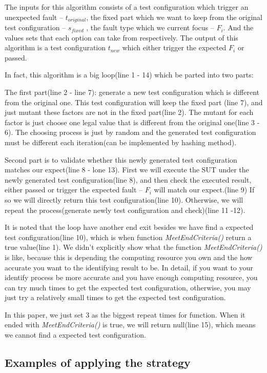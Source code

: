 \documentclass{sig-alternate}
\begin{document}
The inputs for this algorithm consists of a test configuration which trigger an unexpected fault -- $t_{original}$, the fixed part which we want to keep from the original test configuration -- $s_{fixed}$ , the fault type which we current focus -- $F_{i}$. And the values sets that each option can take from respectively.  The output of this algorithm is a test configuration $t_{new}$ which either trigger the expected $F_{i}$ or passed.

In fact, this algorithm is a big loop(line 1 - 14) which be parted into two parts:

The first part(line 2 - line 7): generate a new test configuration which is different from the original one. This test configuration will keep the fixed part (line 7), and just mutant these factors are not in the fixed part(line 2). The mutant for each factor is just choose one legal value that is different from the original one(line 3 - 6). The choosing process is just by random and the generated test configuration must be different each iteration(can be implemented by hashing method).

Second part is to validate whether this newly generated test configuration matches our expect(line 8 - lone 13). First we will execute the SUT under the newly generated test configuration(line 8), and then check the executed result, either passed or trigger the expected fault -- $F_{i}$ will match our expect.(line 9) If so we will directly return this test configuration(line 10). Otherwise, we will repeat the process(generate newly test configuration and check)(line 11 -12).

It is noted that the loop have another end exit besides we have find a expected test configuration(line 10), which is when function \emph{MeetEndCriteria()} return a true value(line 1). We didn't explicitly show what the function \emph{MeetEndCriteria()} is like, because this is depending the computing resource you own and the how accurate you want to the identifying result to be. In detail, if you want to your identify process be more accurate and you have enough computing resource, you can try much times to get the expected test configuration, otherwise, you may just try a relatively small times to get the expected test configuration.

In this paper, we just set 3 as the biggest repeat times for function. When it ended with \emph{MeetEndCriteria()} is true, we will return null(line 15), which means we cannot find a expected test configuration.

\subsection{Examples of applying the strategy}
\end{document}
